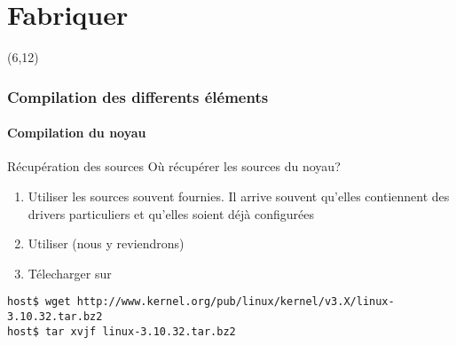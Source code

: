 %
%

\part{Fabriquer}

{
\begin{frame}[plain]
  \partpage
  \begin{textblock}{10}(6,12)
    \begin{quote}
      \rmfamily\textit\textbf\color{darkgray}{\large
        ``Talk is cheap. Show me the code.''}
        \vskip3mm\hspace*{}
    \end{quote}
  \end{textblock}
\end{frame}
}

\begin{frame}
  \partpage
\end{frame}

\begin{frame}
  \tableofcontents
\end{frame}

\section{Compilation des differents éléments}

\subsection{Compilation du noyau}

\begin{frame}[fragile=singleslide]{Récupération des sources}
  Où récupérer les sources du noyau?
  \begin{enumerate}
  \item Utiliser  les sources souvent fournies.  Il arrive souvent
    qu'elles  contiennent  des  drivers particuliers  et  qu'elles
    soient déjà configurées
  \item Utiliser  (nous y reviendrons)
  \item Télecharger sur 
  \end{enumerate}
  \begin{lstlisting}
host$ wget http://www.kernel.org/pub/linux/kernel/v3.X/linux-3.10.32.tar.bz2
host$ tar xvjf linux-3.10.32.tar.bz2
  \end{lstlisting}
\end{frame}

